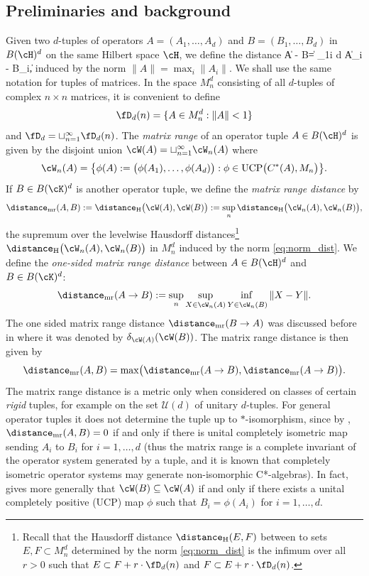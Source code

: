 \subsection{Preliminaries and background}
Given two $d$-tuples of operators $A = (A_1, \ldots, A_d)$ and $B = (B_1, \ldots, B_d)$ in $B(\cH)^d$ on the same Hilbert space $\cH$, we define the distance
\be\label{eq:norm_dist}
\|A - B\| = \max_{1\leq i \leq d} \|A_i - B_i\|, 
\ee
induced by the norm $\|A\| =\max_i \|A_i\|$. We shall use the same notation for tuples of matrices. 
In the space $M_n^d$ consisting of all $d$-tuples of complex $n \times n$ matrices, it is convenient to define 
\[
\fD_d(n) = \{A \in M_n^d : \|A\| < 1\}
\]
and $\fD_d = \sqcup_{n=1}^\infty \fD_d(n)$. 
The \emph{matrix range} of an operator tuple $A \in B(\cH)^d$ is given by the disjoint union $\cW(A) = \sqcup_{n=1}^\infty \cW_n(A)$ where
\[
\cW_n(A) = \bigl\{\phi(A):= \bigl(\phi(A_1), \ldots, \phi(A_d)\bigr) :\phi\in \operatorname{UCP}\bigl(C^*(A), M_n\bigr)\bigr\}. 
\]
If $B \in B(\cK)^d$ is another operator tuple, we define the {\em matrix range distance} by 
\[
\distance_{\mathrm{mr}}(A,B):=\distance_{\mathrm H}\bigl(\cW(A),\cW(B)\bigr) := \sup_n \distance_{\mathrm H}\bigl(\cW_n(A),\cW_n(B)\bigr) ,
\]
the supremum over the levelwise Hausdorff distances\footnote{Recall that the Hausdorff distance $\distance_{\mathrm H}(E,F)$ between to sets $E,F \subset M_n^d$ determined by the norm \cref*{eq:norm_dist} is the infimum over all $r>0$ such that $E \subset F + r\cdot \fD_d(n)$ and $F \subset E + r \cdot \fD_d(n)$.} $\distance_{\mathrm H}\bigl(\cW_n(A),\cW_n(B)\bigr)$ in $M_n^d$ induced by the norm \cref*{eq:norm_dist}. 
We define the \emph{one-sided matrix range distance} between $A \in B(\cH)^d$ and $B \in B(\cK)^d$:
\[
  \distance_{\mathrm{mr}}(A\to B):= \sup_n \sup_{X\in \cW_n(A)}\mathop{\inf\vphantom{sup}}_{Y\in \cW_n(B)} \|X-Y\| .
\]
The one sided matrix range distance $\distance_{\mathrm{mr}}(B\to A)$ was discussed before in \cite[Section 5]{DDSS17} where it was denoted by $\delta_{\cW(A)}(\cW(B))$. The {matrix range distance} is then given by 
\[
\distance_{\mathrm{mr}}(A,B)= \max \bigl(\distance_{\mathrm{mr}}(A\to B),\distance_{\mathrm{mr}}(A\to B)\bigr) .
\]
The matrix range distance is a metric only when considered on classes of certain {\em rigid} tuples, for example on the set $\mathcal U(d)$ of unitary $d$-tuples. 
For general operator tuples it does not determine the tuple up to $*$-isomorphism, since by \cite[Proposition 5.5]{DDSS17}, $\distance_{\mathrm{mr}}(A,B) = 0$ if and only if there is unital completely isometric map sending $A_i$ to $B_i$ for $i=1, \ldots, d$ (thus the matrix range is a complete invariant of the operator system generated by a tuple, and it is known that completely isometric operator systems may generate non-isomorphic C*-algebras). 
In fact, \cite[Proposition 5.5]{DDSS17} gives more generally that $\cW(B) \subseteq \cW(A)$ if and only if there exists a unital completely positive (UCP) map $\phi$ such that $B_i = \phi(A_i)$ for $i = 1, \ldots, d$. 

